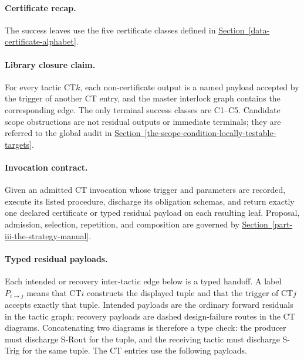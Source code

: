 \documentclass[
  11pt,
]{article}
\theoremstyle{definition}
\newcommand{\secref}[1]{\hyperref[#1]{Section~\ref*{#1}}}
\begin{document}
\paragraph{Certificate recap.}
The success leaves use the five certificate classes defined in
\secref{data-certificate-alphabet}.

\paragraph{Library closure claim.}
For every tactic CT\(k\), each non-certificate output is a named
payload accepted by the trigger of another CT entry, and the master
interlock graph contains the corresponding edge.  The only terminal
success classes are C1--C5. Candidate scope obstructions are not residual
outputs or immediate terminals; they are referred to the global audit in
\secref{the-scope-condition-locally-testable-targets}.

\paragraph{Invocation contract.}
Given an admitted CT invocation whose trigger and parameters are
recorded, execute its listed procedure, discharge its obligation
schemas, and return exactly one declared certificate or typed residual
payload on each resulting leaf.  Proposal, admission, selection,
repetition, and composition are governed by
\secref{part-iii-the-strategy-manual}.

\paragraph{Typed residual payloads.}
Each intended or recovery inter-tactic edge below is a typed handoff.  A
label \(P_{i\to j}\) means that CT\(i\) constructs the displayed tuple
and that the trigger of CT\(j\) accepts exactly that tuple.  Intended
payloads are the ordinary forward residuals in the tactic graph;
recovery payloads are dashed design-failure routes in the CT diagrams.
Concatenating two diagrams is therefore a type check: the producer must
discharge S-Rout for the tuple, and the receiving tactic must discharge
S-Trig for the same tuple.  The CT entries use the following payloads.
\end{document}
